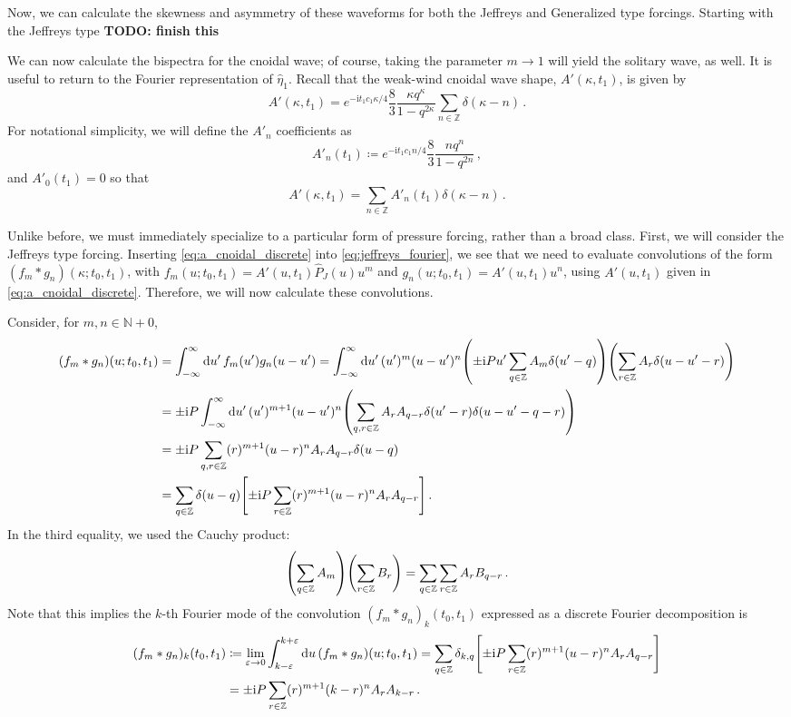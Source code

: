 \documentclass{jfm}
\newcommand{\im}{\mathrm{i}}
\renewcommand*{\epsilon}{\varepsilon}
\begin{document}
Now, we can calculate the skewness and asymmetry of these waveforms for
both the Jeffreys and Generalized type forcings.
Starting with the Jeffreys type
\textbf{TODO: finish this}

We can now calculate the bispectra for the cnoidal wave; of course,
taking the parameter $m \to 1$ will yield the solitary wave, as well.
It is useful to return to the Fourier representation of $\hat{\eta}_1$.
Recall that the weak-wind cnoidal wave shape, $A'(\kappa,t_1)$, is given
by
\[
  A'(\kappa,t_1) = e^{-\im t_1 c_1 \kappa/4}
  \frac{8}{3} \frac{\kappa q^{\kappa}}{1-q^{2\kappa}} \sum_{n \in
  \mathbb{Z}} \delta(\kappa - n) \,.
\]
For notational simplicity, we will define the $A'_n$ coefficients as
\[
  A'_n(t_1) \coloneqq e^{-\im t_1 c_1 n/4}
  \frac{8}{3} \frac{n q^n}{1-q^{2n}} \,,
\]
and $A'_0(t_1) = 0$ so that
\begin{equation}
  A'(\kappa,t_1) = \sum_{n \in \mathbb{Z}} A'_n(t_1) \delta(\kappa - n) \,.
  \label{eq:a_cnoidal_discrete}
\end{equation}

Unlike before, we must immediately specialize to a particular form of
pressure forcing, rather than a broad class.
First, we will consider the Jeffreys type forcing.
Inserting \cref{eq:a_cnoidal_discrete} into \cref{eq:jeffreys_fourier},
we see that we need to evaluate convolutions of the form $(f_m *
g_n)(\kappa;t_0,t_1)$, with $f_m(u;t_0,t_1) = A'(u,t_1) \hat{P}_J(u)
u^m$ and $g_n(u;t_0,t_1) = A'(u,t_1) u^n$, using $A'(u,t_1)$ given in
\cref{eq:a_cnoidal_discrete}.
Therefore, we will now calculate these convolutions.

Consider, for $m,n \in \mathbb{N} + {0}$,
\begin{align*}
  (f_m * g_n)(u;t_0,t_1) &=
  \int_{-\infty}^{\infty} \dd{u'} f_m(u') g_n(u-u')
  = \int_{-\infty}^{\infty} \dd{u'} (u')^m (u-u')^n \pqty{\pm \im P u'
    \sum_{q\in\mathbb{Z}} A_m \delta(u' - q)}
    \pqty{\sum_{r\in\mathbb{Z}} A_r \delta(u-u' - r)} \\
  &=
    \pm \im P \int_{-\infty}^{\infty} \dd{u'} (u')^{m+1} (u-u')^n \pqty{
    \sum_{q,r\in\mathbb{Z}} A_r A_{q-r} \delta(u' - r) \delta(u-u'-q-r)} \\
  &=
    \pm \im P \sum_{q,r\in\mathbb{Z}} (r)^{m+1} (u-r)^n A_r A_{q-r} \delta(u-q) \\
  &=
    \sum_{q\in\mathbb{Z}} \delta(u-q) \bqty{\pm \im P
    \sum_{r\in\mathbb{Z}} (r)^{m+1} (u-r)^n A_r A_{q-r}} \,.
\end{align*}
In the third equality, we used the Cauchy product:
\[
  \pqty{\sum_{q\in\mathbb{Z}} A_m } \pqty{\sum_{r\in\mathbb{Z}} B_r}
  = \sum_{q\in\mathbb{Z}} \sum_{r\in\mathbb{Z}} A_r B_{q-r} \,.
\]
Note that this implies the $k$-th Fourier mode of the convolution
$(f_m*g_n)_k(t_0,t_1)$ expressed as a discrete Fourier decomposition is
\begin{align*}
  (f_m*g_n)_k(t_0,t_1) &\coloneqq \lim_{\epsilon \to 0}
  \int_{k-\epsilon}^{k+\epsilon} \dd{u} (f_m*g_n)(u;t_0,t_1)
  =
    \sum_{q\in\mathbb{Z}} \delta_{k,q} \bqty{\pm \im P
    \sum_{r\in\mathbb{Z}} (r)^{m+1} (u-r)^n A_r A_{q-r}} \\
  &= \pm \im P \sum_{r\in\mathbb{Z}} (r)^{m+1}
  (k-r)^n A_r A_{k-r} \,.
\end{align*}
\end{document}
